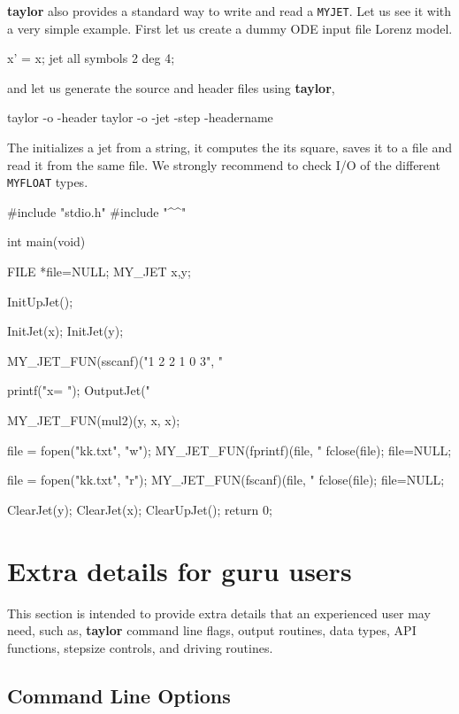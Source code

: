 \documentclass[10pt]{article}
\theoremstyle{remark}
\newcommand{\taylorname}{{\bf taylor}}
\newcommand{\myfloat}{{\tt MY\symbol{95}FLOAT}}
\newcommand{\myjet}{{\tt MY\symbol{95}JET}}
\newcommand{\inputfile}{}
\newcommand{\mainfile}{}
\newcommand{\odecfile}{}
\newcommand{\odehfile}{}
\begin{document}
\taylorname{} also provides a standard way to write and read a
\myjet{}. Let us see it with a very simple example. First let us
create a dummy ODE input file \inputfile{} Lorenz model.
\begin{code}[title={File: \inputfile{}}]
    x' = x;    
    jet all symbols 2 deg 4;
\end{code}
and let us generate the source and header files using \taylorname{},
\begin{command}
    taylor -o \odehfile{} -header \inputfile{}
    taylor -o \odecfile{} -jet -step -headername \odehfile{} \inputfile{}
\end{command}
The \mainfile{} initializes a jet from a string, it computes the its
square, saves it to a file and read it from the same file. We strongly
recommend to check I/O of the different \myfloat{} types.
\begin{code}[title={File: \mainfile{}}]
    #include "stdio.h"
    #include "^\odehfile{}^"

    int main(void)
    {
      FILE *file=NULL;
      MY_JET x,y;
      
      InitUpJet();
      
      InitJet(x); InitJet(y); 
      
      MY_JET_FUN(sscanf)("1 2 2 1 0 3", "%
      
      printf("x= "); OutputJet("%
      
      MY_JET_FUN(mul2)(y, x, x);
      
      
      file = fopen("kk.txt", "w");   
      MY_JET_FUN(fprintf)(file, "%
      fclose(file); file=NULL;
      
      file = fopen("kk.txt", "r");   
      MY_JET_FUN(fscanf)(file, "%
      fclose(file); file=NULL;
      
      ClearJet(y); ClearJet(x); 
      ClearUpJet();
      return 0;
    }
\end{code}

\section{Extra details for guru users} \label{sec:advanced}
This section is intended to provide extra details that an experienced
user may need, such as, \taylorname{} command line flags, output
routines, data types, API functions, stepsize controls, and driving
routines.


\subsection{Command Line Options}\label{sec:clo}
\end{document}
